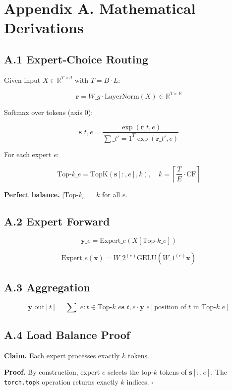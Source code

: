 \section{Appendix A. Mathematical Derivations}

\subsection{A.1 Expert-Choice Routing}

Given input $X \in \mathbb{R}^{T \times d}$ with $T = B \cdot L$:

\[
\mathbf{r} = W\_g \cdot \text{LayerNorm}(X) \in \mathbb{R}^{T \times E}
\tag{A.1}
\]

Softmax over tokens (axis 0):

\[
\mathbf{s}\_{t, e} = \frac{\exp(\mathbf{r}\_{t, e})}{\sum\_{t'=1}^{T} \exp(\mathbf{r}\_{t', e})}
\tag{A.2}
\]

For each expert $e$:

\[
\text{Top-}k\_e = \text{TopK}(\mathbf{s}[:, e], k), \quad k = \left\lceil \frac{T}{E} \cdot \text{CF} \right\rceil
\tag{A.3}
\]

\textbf{Perfect balance.} $|\text{Top-}k_e| = k$ for all $e$.

\subsection{A.2 Expert Forward}

\[
\mathbf{y}\_e = \text{Expert}\_e(X[\text{Top-}k\_e])
\tag{A.4}
\]

\[
\text{Expert}\_e(\mathbf{x}) = W\_2^{(e)} \text{GELU}(W\_1^{(e)} \mathbf{x})
\tag{A.5}
\]

\subsection{A.3 Aggregation}

\[
\mathbf{y}\_{\text{out}}[t] = \sum\_{e : t \in \text{Top-}k\_e} \mathbf{s}\_{t, e} \cdot \mathbf{y}\_e[\text{position of } t \text{ in } \text{Top-}k\_e]
\tag{A.6}
\]

\subsection{A.4 Load Balance Proof}

\textbf{Claim.} Each expert processes exactly $k$ tokens.

\textbf{Proof.} By construction, expert $e$ selects the top-$k$ tokens of 
$\mathbf{s}[:, e]$. The \texttt{torch.topk} operation returns exactly $k$ 
indices. $\square$

